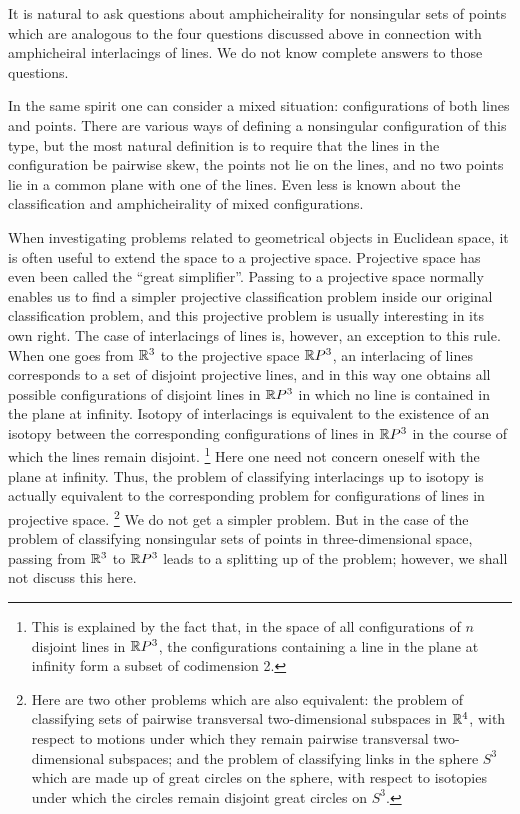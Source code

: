\documentclass{article}
\begin{document}
It is natural to ask questions about amphicheirality for nonsingular sets of
points which are analogous to the four questions discussed above in 
connection with amphicheiral interlacings of lines. We do not know
complete answers to those questions.






In the same spirit one can consider a mixed situation: configurations of both
lines and points. There are various ways of defining a nonsingular 
configuration
of this type, but the most natural definition is to require that the lines in
the configuration be pairwise skew, the points not lie on the lines, and no two
points lie in a common plane with one of the lines. Even less is known about
the classification and amphicheirality of mixed configurations.

When investigating problems related to geometrical objects in
Euclidean 
space,
it is often useful to extend the space to a projective space. Projective space
has even been called the ``great simplifier''. Passing to a projective space
normally enables us to find a simpler projective classification problem inside
our original classification problem, and this projective problem is usually
interesting in its own right. The case of interlacings of lines is, however, an
exception to this rule. When one goes from $\mathbb{R}^3$ to the projective space
$\mathbb{R} P^3$, an interlacing of lines corresponds to a set of disjoint
projective lines, and in this way one obtains all possible configurations of
disjoint lines in $\mathbb{R} P^3$ in which no line is contained in the plane at
infinity. Isotopy of interlacings is equivalent to the existence of an isotopy
between the corresponding configurations of lines in $\mathbb{R} P^3$ in the course
of which the lines remain disjoint.
\footnote{This is explained by the fact that, in the space of all 
configurations of
$n$ disjoint lines in $\mathbb{R} P^3$, the configurations containing a line in the
plane at infinity form a subset of codimension 2.}
Here one need not concern oneself with the plane at infinity. Thus, the problem
of classifying interlacings up to isotopy is actually equivalent to the
corresponding problem for configurations of lines in projective space.
\footnote{Here are two other problems which are also equivalent: the 
problem of
classifying sets of pairwise transversal two-dimensional subspaces in $\mathbb{R}^4$, 
with respect to motions under which they remain pairwise transversal
two-dimensional subspaces; and the problem of classifying links in the sphere
$S^3$ which are made up of great circles on the sphere, with respect to
isotopies under which the circles remain disjoint great circles on $S^3$.}
We do not get a simpler problem. But in the case of the problem of classifying
nonsingular sets of points in three-dimensional space, passing from $\mathbb{R}^3$
to $\mathbb{R} P^3$ leads to a splitting up of the problem; however, we shall not
discuss this here.
\end{document}

